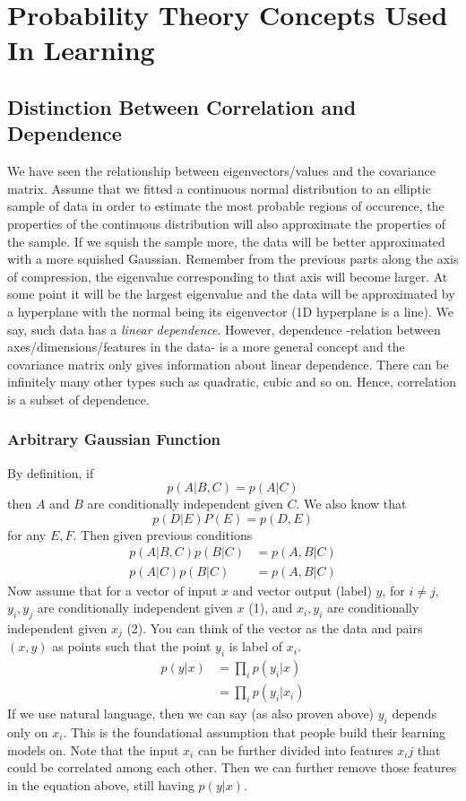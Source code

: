 \documentclass{article}
\numberwithin{equation}{subsection}
\begin{document}
\section{Probability Theory Concepts Used In Learning}
\subsection{Distinction Between Correlation and Dependence}
We have seen the relationship between eigenvectors/values and the covariance matrix. Assume that we fitted a continuous normal distribution to an elliptic
sample of data in order to estimate the most probable regions of occurence, the properties of the continuous distribution will also approximate the properties of the sample. If we squish the sample more, the data will be better approximated with a more squished Gaussian. Remember from the previous parts along the axis of compression, the eigenvalue corresponding to that axis will become larger. At some point it will be the largest eigenvalue and the data will be approximated by a hyperplane with the normal being its eigenvector (1D hyperplane is a line). We say, such data has a \textit{linear dependence}. However, dependence -relation between axes/dimensions/features in the data- is a more general concept and the covariance matrix only gives information about linear dependence. There can be infinitely many other types such as quadratic, cubic and so on. Hence, correlation is a subset of dependence.  
\subsubsection{Arbitrary Gaussian Function}
By definition, if
\begin{equation}
    p(A|B,C) = p(A|C)
\end{equation}
then $A$ and $B$ are conditionally independent given $C$. We also know that 
\begin{equation}
    p(D|E)P(E) = p(D,E)
\end{equation}
for any $E, F$. Then given previous conditions
\begin{align}
    p(A|B,C)p(B|C) &= p(A,B|C)\\
    p(A|C)p(B|C) &= p(A,B|C)
\end{align}
Now assume that for a vector of input $x$ and vector output (label) $y$, for $i \neq j$, $y_i, y_j$ are conditionally independent given $x$ (1), and $x_i, y_i$ are conditionally independent given $x_j$ (2). You can think of the vector as the data and pairs $(x,y)$ as points such that the point $y_i$ is label of $x_i$.
\begin{align}
    p(y|x) &= \prod_i p(y_i|x)\\
           &= \prod_i p(y_i|x_i)
\end{align}
If we use natural language, then we can say (as also proven above) $y_i$ depends only on $x_i$. This is the foundational assumption that people build their learning models on. Note that the input $x_i$ can be further divided into features $x_ij$ that could be correlated among each other. Then we can further remove those features in the equation above, still having $p(y|x)$. 
\end{document}
